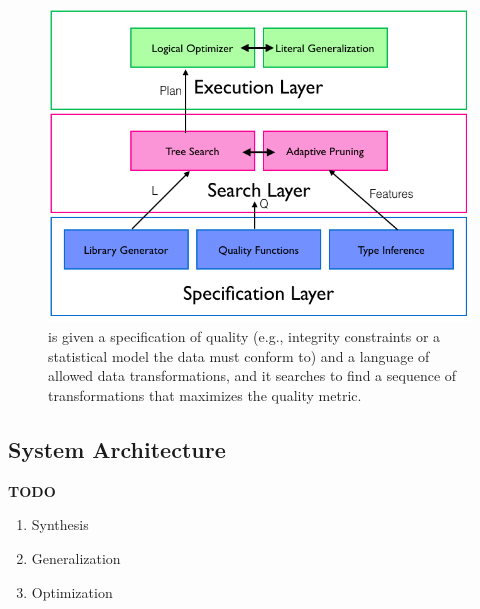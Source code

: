 \begin{figure}[t]
\centering
 \includegraphics[width=\columnwidth]{figures/alphacleanarch.png}
 \caption{ \sys is given a specification of quality (e.g., integrity constraints or a statistical model the data must conform to) and a language  of  allowed  data  transformations,  and  it  searches  to find a sequence of transformations that maximizes the quality metric. }
\end{figure}


\subsection{System Architecture}

\textbf{TODO}

\begin{enumerate}
    \item Synthesis
    \item Generalization
    \item Optimization
\end{enumerate}





